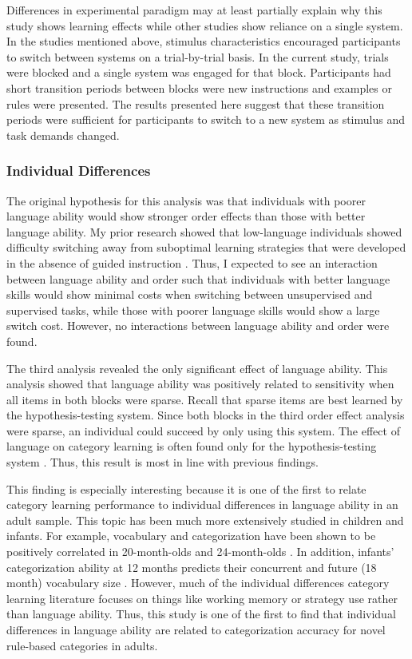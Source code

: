 \documentclass[../dissertation.tex]{subfiles}
\begin{document}
	Differences in experimental paradigm may at least partially explain why this study shows learning effects while other studies show reliance on a single system. In the studies mentioned above, stimulus characteristics encouraged participants to switch between systems on a trial-by-trial basis. In the current study, trials were blocked and a single system was engaged for that block. Participants had short transition periods between blocks were new instructions and examples or rules were presented. The results presented here suggest that these transition periods were sufficient for participants to switch to a new system as stimulus and task demands changed. 
	
\subsubsection{Individual Differences}

	The original hypothesis for this analysis was that individuals with poorer language ability would show stronger order effects than those with better language ability. My prior research showed that low-language individuals showed difficulty switching away from suboptimal learning strategies that were developed in the absence of guided instruction \citep{Ryherd2019}. Thus, I expected to see an interaction between language ability and order such that individuals with better language skills would show minimal costs when switching between unsupervised and supervised tasks, while those with poorer language skills would show a large switch cost. However, no interactions between language ability and order were found. \par
	The third analysis revealed the only significant effect of language ability. This analysis showed that language ability was positively related to sensitivity when all items in both blocks were sparse. Recall that sparse items are best learned by the hypothesis-testing system. Since both blocks in the third order effect analysis were sparse, an individual could succeed by only using this system. The effect of language on category learning is often found only for the hypothesis-testing system \citep{Lupyan2009,Lupyan2013}. Thus, this result is most in line with previous findings. \par 
	This finding is especially interesting because it is one of the first to relate category learning performance to individual differences in language ability in an adult sample. This topic has been much more extensively studied in children and infants. For example, vocabulary and  categorization have been shown to be positively correlated in 20-month-olds \citep{Nazzi2001} and 24-month-olds \citep{Jaswal2007}. In addition, infants' categorization ability at 12 months predicts their concurrent and future (18 month) vocabulary size \citep{Ferguson2015}. However, much of the individual differences category learning literature focuses on things like working memory or strategy use rather than language ability. Thus, this study is one of the first to find that individual differences in language ability are related to categorization accuracy for novel rule-based categories in adults.
	
\end{document}
